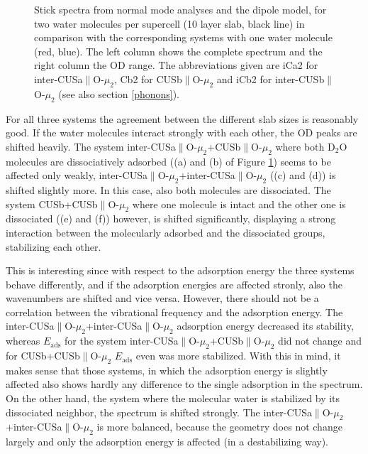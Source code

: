 \documentclass[11pt,DIV=13,BCOR=5mm,a4paper,headinclude]{scrbook}
\begin{document}
\begin{figure}[!h]
             \quad
{}
\caption{Stick spectra from normal mode analyses and the dipole model, for two water molecules per supercell (10 layer slab, black line) in comparison with the corresponding systems with one water molecule (red, blue).
The left column shows the complete spectrum and the right column the OD range.
The abbreviations given are iCa2 for inter-CUSa$\parallel$O-$\mu_2$, Cb2 for CUSb$\parallel$O-$\mu_2$ and iCb2 for inter-CUSb$\parallel$O-$\mu_2$ (see also section \ref{phonons}).}
            \label{abb:2water_comp}
\end{figure}
For all three systems the agreement between the different slab sizes is reasonably good.
If the water molecules interact strongly with each other, the OD peaks are shifted heavily.
The system inter-CUSa$\parallel$O-$\mu_2$+CUSb$\parallel$O-$\mu_2$ where both D$_2$O molecules are dissociatively adsorbed ((a) and (b) of Figure \ref{abb:2water_comp}) seems to be affected only weakly, inter-CUSa$\parallel$O-$\mu_2$+inter-CUSa$\parallel$O-$\mu_2$ ((c) and (d)) is shifted slightly more.
In this case, also both molecules are dissociated.
The system CUSb+CUSb$\parallel$O-$\mu_2$ where one molecule is intact and the other one is dissociated ((e) and (f)) however, is shifted  significantly, displaying a strong interaction between the molecularly adsorbed and the dissociated groups, stabilizing each other.

This is interesting since with respect to the adsorption energy the three systems behave differently, and if the adsorption energies are affected stronly, also the wavenumbers are shifted and vice versa.
However, there should not be a correlation between the vibrational frequency and the adsorption energy.
The inter-CUSa$\parallel$O-$\mu_2$+inter-CUSa$\parallel$O-$\mu_2$ adsorption energy decreased its stability, whereas $E_\textrm{ads}$ for the system inter-CUSa$\parallel$O-$\mu_2$+CUSb$\parallel$O-$\mu_2$ did not change and for CUSb+CUSb$\parallel$O-$\mu_2$ $E_\textrm{ads}$ even was more stabilized.
With this in mind, it makes sense that those systems, in which the adsorption energy is slightly affected also shows hardly any difference to the single adsorption in the spectrum.
On the other hand, the system where the molecular water is stabilized by its dissociated neighbor, the spectrum is shifted strongly.
The inter-CUSa$\parallel$O-$\mu_2$+inter-CUSa$\parallel$O-$\mu_2$ is more balanced, because the geometry does not change largely and only the adsorption energy is affected (in a destabilizing way).
\end{document}
